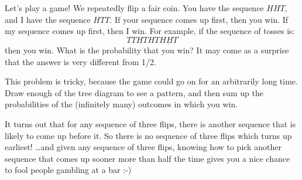 \documentclass[12pt,twoside]{article}
\begin{document}
\begin{problem}{14}
Let's play a game!  We repeatedly flip a fair coin.  You have the
sequence $HHT$, and I have the sequence $HTT$.  If your sequence comes
up first, then you win.  If my sequence comes up first, then I win.
For example, if the sequence of tosses is:
\[
TTHTHT\underline{HHT}
\]
then you win.  What is the probability that you win?  It may come as a
surprise that the answer is very different from 1/2.

This problem is tricky, because the game could go on for an arbitrarily
long time.  Draw enough of the tree diagram to see a pattern, and then sum
up the probabilities of the (infinitely many) outcomes in which you win.

It turns out that for any sequence of three flips, there is another
sequence that is likely to come up before it.  So there is no sequence of three flips
which turns up earliest! \dots and given any sequence of three flips, knowing how to pick
another sequence that comes up sooner more than half the time gives you a
nice chance to fool people gambling at a bar :-)


\end{problem}
\end{document}
